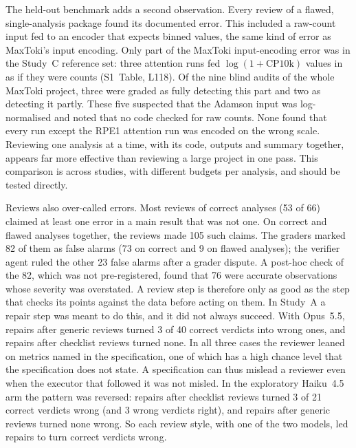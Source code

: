 \documentclass[10pt,letterpaper]{article}
\begin{document}
The held-out benchmark adds a second observation. Every review of a
flawed, single-analysis package found its documented error. This
included a raw-count input fed to an encoder that expects binned values,
the same kind of error as MaxToki's input encoding. Only part of
the MaxToki input-encoding error was in the Study~C reference set: three attention runs
fed $\log(1+\text{CP10k})$ values in as if they were counts (S1~Table,
L118). Of the nine blind audits of the whole MaxToki project, three were
graded as fully detecting this part and two as detecting it partly. These
five suspected that the Adamson input was log-normalised and noted that
no code checked for raw counts. None found that every run except the RPE1
attention run was encoded on the wrong scale.
Reviewing one analysis at a time, with its code, outputs and summary
together, appears far more effective than reviewing a large project in
one pass. This comparison is across studies, with different budgets per
analysis, and should be tested directly.

Reviews also over-called errors. Most reviews of correct analyses (53 of
66) claimed at least one error in a main result that was not one. On
correct and flawed analyses together, the reviews made 105 such claims.
The graders marked 82 of them as false alarms (73 on correct and 9 on
flawed analyses); the verifier agent ruled the other 23 false alarms
after a grader dispute. A post-hoc check of the 82, which was not
pre-registered, found that 76 were accurate observations whose severity
was overstated. A review step
is therefore only as good as the step that checks its points against the
data before acting on them. In Study~A a repair step was meant to do
this, and it did not always succeed. With Opus~5.5, repairs after generic
reviews turned 3 of 40 correct verdicts into wrong ones, and repairs
after checklist reviews turned none. In all three cases the reviewer
leaned on metrics named in the specification, one of which has a high
chance level that the specification does not state. A specification can
thus mislead a reviewer even when the executor that followed it was not
misled. In the exploratory Haiku~4.5 arm the pattern was reversed:
repairs after checklist reviews turned 3 of 21 correct verdicts wrong
(and 3 wrong verdicts right), and repairs after generic reviews turned
none wrong. So each review style, with one of the two models, led
repairs to turn correct verdicts wrong.
\end{document}
